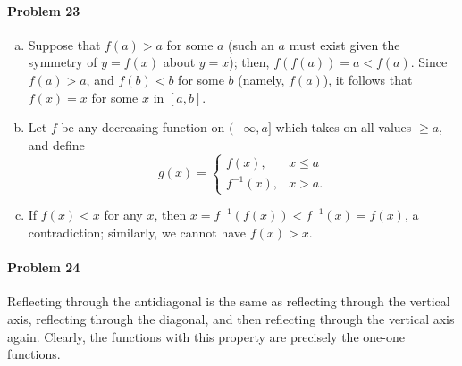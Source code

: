 \documentclass{article}
\begin{document}
\paragraph{Problem 23}
\begin{enumerate}[(a)]
  \item Suppose that $f(a) > a$ for some $a$ (such an $a$ must exist given the
    symmetry of $y = f(x)$ about $y = x$); then, $f(f(a)) = a < f(a)$. Since
    $f(a) > a$, and $f(b) < b$ for some $b$ (namely, $f(a)$), it follows that
    $f(x) = x$ for some $x$ in $[a, b]$.
  \item Let $f$ be any decreasing function on $(-\infty, a]$ which takes on all
    values $\geq a$, and define \[
      g(x) =
      \begin{cases}
        f(x), &x \leq a \\
        f^{-1}(x), &x > a.
      \end{cases}
    \]
  \item If $f(x) < x$ for any $x$, then $x = f^{-1}(f(x)) < f^{-1}(x) = f(x)$,
    a contradiction; similarly, we cannot have $f(x) > x$.
\end{enumerate}

\paragraph{Problem 24} Reflecting through the antidiagonal is the same as
reflecting through the vertical axis, reflecting through the diagonal, and then
reflecting through the vertical axis again. Clearly, the functions with this
property are precisely the one-one functions.
\end{document}
